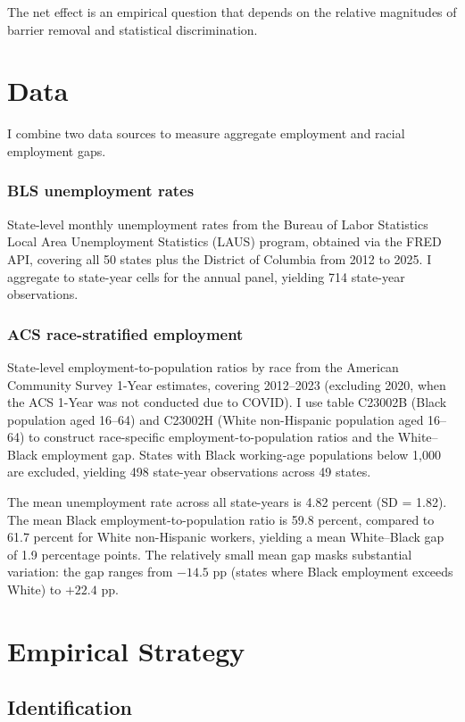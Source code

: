 \documentclass[12pt]{article}
\begin{document}
The net effect is an empirical question that depends on the relative magnitudes of barrier removal and statistical discrimination.

\section{Data}

I combine two data sources to measure aggregate employment and racial employment gaps.

\subsubsection*{BLS unemployment rates} State-level monthly unemployment rates from the Bureau of Labor Statistics Local Area Unemployment Statistics (LAUS) program, obtained via the FRED API, covering all 50 states plus the District of Columbia from 2012 to 2025. I aggregate to state-year cells for the annual panel, yielding 714 state-year observations.

\subsubsection*{ACS race-stratified employment} State-level employment-to-population ratios by race from the American Community Survey 1-Year estimates, covering 2012--2023 (excluding 2020, when the ACS 1-Year was not conducted due to COVID). I use table C23002B (Black population aged 16--64) and C23002H (White non-Hispanic population aged 16--64) to construct race-specific employment-to-population ratios and the White--Black employment gap. States with Black working-age populations below 1,000 are excluded, yielding 498 state-year observations across 49 states.



The mean unemployment rate across all state-years is 4.82 percent (SD = 1.82). The mean Black employment-to-population ratio is 59.8 percent, compared to 61.7 percent for White non-Hispanic workers, yielding a mean White--Black gap of 1.9 percentage points. The relatively small mean gap masks substantial variation: the gap ranges from $-14.5$ pp (states where Black employment exceeds White) to $+22.4$ pp.

\section{Empirical Strategy}

\subsection{Identification}
\end{document}

